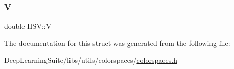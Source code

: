 \mbox{\label{struct_h_s_v_aade636e6ce581e93de5374f0e5d77d7c}} 
\subsubsection{\texorpdfstring{V}{V}}
{\footnotesize\ttfamily double H\+S\+V\+::V}



The documentation for this struct was generated from the following file\+:\begin{DoxyCompactItemize}
\item 
Deep\+Learning\+Suite/libs/utils/colorspaces/\hyperlink{colorspaces_8h}{colorspaces.\+h}\end{DoxyCompactItemize}
